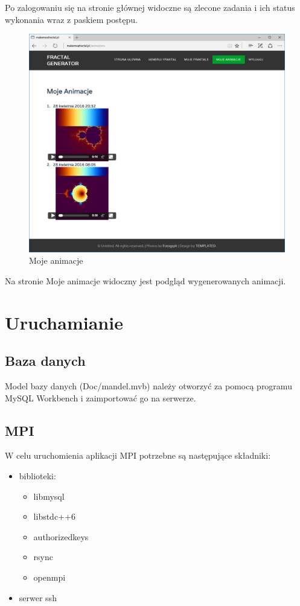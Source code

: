 \documentclass[a4paper]{article}
\begin{document}
Po zalogowaniu się na stronie głównej widoczne są zlecone zadania i ich status wykonania wraz z paskiem postępu.
\begin{figure}[H]
    \centering
    \includegraphics[width=\textwidth]{my_frac.png}
    \caption{Moje animacje}
    \label{fig:my_frac}
\end{figure}
Na stronie Moje animacje widoczny jest podgląd wygenerowanych animacji.

\newpage

\section{Uruchamianie}
\subsection{Baza danych}
Model bazy danych (Doc/mandel.mvb) należy otworzyć za pomocą programu MySQL Workbench i zaimportować go na serwerze.

\subsection{MPI}
W celu uruchomienia aplikacji MPI potrzebne są następujące składniki:
\begin{itemize}
\item biblioteki:
\begin{itemize}
\item libmysql
\item libstdc++6
\item authorizedkeys
\item rsync
\item openmpi
\end{itemize}
\item serwer ssh
\end{itemize}
\end{document}
